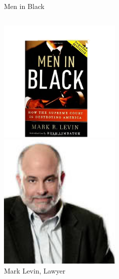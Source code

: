 \begin{frame}{Men in Black}
    \begin{columns}[onlytextwidth]
            \centering
            \includegraphics[width=0.75\textwidth]{img/men-in-black.png} \\

            \centering
            \includegraphics[width=0.75\textwidth]{img/mark-levin.png} \\
            Mark Levin, Lawyer \\
    \end{columns}
\end{frame}

